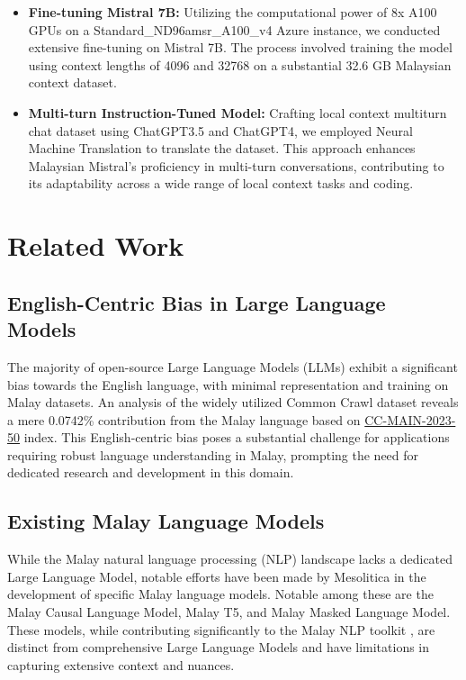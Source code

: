 \documentclass[preprint]{article}
\begin{document}
\begin{itemize}
  \item \textbf{Fine-tuning Mistral 7B:} Utilizing the computational power of 8x A100 GPUs on a Standard\_ND96amsr\_A100\_v4 Azure instance, we conducted extensive fine-tuning on Mistral 7B. The process involved training the model using context lengths of 4096 and 32768 on a substantial 32.6 GB Malaysian context dataset.

  \item \textbf{Multi-turn Instruction-Tuned Model:} Crafting local context multiturn chat dataset using ChatGPT3.5 and ChatGPT4, we employed Neural Machine Translation to translate the dataset. This approach enhances Malaysian Mistral's proficiency in multi-turn conversations, contributing to its adaptability across a wide range of local context tasks and coding.
\end{itemize}

\section{Related Work}

\subsection{English-Centric Bias in Large Language Models}

The majority of open-source Large Language Models (LLMs) exhibit a significant bias towards the English language, with minimal representation and training on Malay datasets. An analysis of the widely utilized Common Crawl dataset reveals a mere 0.0742\% contribution from the Malay language based on \href{https://commoncrawl.github.io/cc-crawl-statistics/plots/languages}{CC-MAIN-2023-50} index. This English-centric bias poses a substantial challenge for applications requiring robust language understanding in Malay, prompting the need for dedicated research and development in this domain.

\subsection{Existing Malay Language Models}

While the Malay natural language processing (NLP) landscape lacks a dedicated Large Language Model, notable efforts have been made by Mesolitica in the development of specific Malay language models. Notable among these are the Malay Causal Language Model, Malay T5, and Malay Masked Language Model. These models, while contributing significantly to the Malay NLP toolkit \cite{Malaya}, are distinct from comprehensive Large Language Models and have limitations in capturing extensive context and nuances.
\end{document}
